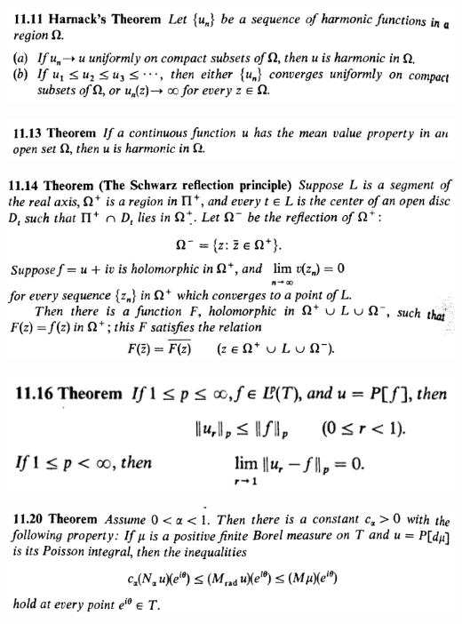 \documentclass[12pt]{article}
\begin{document}
		\begin{center}
		\includegraphics{11ponto11}
		\end{center}

		\begin{center}
		\includegraphics{11ponto13}
		\end{center}

		\begin{center}
		\includegraphics{11ponto14}
		\end{center}

		\begin{center}
		\includegraphics{11ponto16}
		\end{center}

		\begin{center}
		\includegraphics{11ponto20}
		\end{center}
\end{document}
